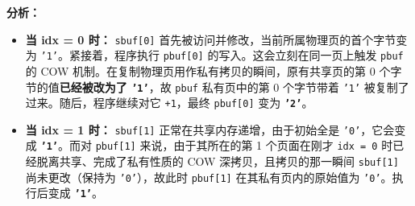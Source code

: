 \documentclass[fleqn]{ctexart}
\begin{document}
\textbf{分析：}
\begin{itemize}
    \item \textbf{当 idx = 0 时：} \texttt{sbuf[0]} 首先被访问并修改，当前所属物理页的首个字节变为 \texttt{'1'}。紧接着，程序执行 \texttt{pbuf[0]} 的写入。这会立刻在同一页上触发 \texttt{pbuf} 的 COW 机制。在复制物理页用作私有拷贝的瞬间，原有共享页的第 $0$ 个字节的值\textbf{已经被改为了 \texttt{'1'}}，故 \texttt{pbuf} 私有页中的第 $0$ 个字节带着 \texttt{'1'} 被复制了过来。随后，程序继续对它 \texttt{+1}，最终 \texttt{pbuf[0]} 变为 \textbf{\texttt{'2'}}。
    \item \textbf{当 idx = 1 时：} \texttt{sbuf[1]} 正常在共享内存递增，由于初始全是 \texttt{'0'}，它会变成 \textbf{\texttt{'1'}}。而对 \texttt{pbuf[1]} 来说，由于其所在的第 1 个页面在刚才 \texttt{idx = 0} 时已经脱离共享、完成了私有性质的 COW 深拷贝，且拷贝的那一瞬间 \texttt{sbuf[1]} 尚未更改（保持为 \texttt{'0'}），故此时 \texttt{pbuf[1]} 在其私有页内的原始值为 \texttt{'0'}。执行后变成 \textbf{\texttt{'1'}}。
\end{itemize}
\end{document}
